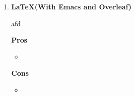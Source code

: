 \documentclass[a4paper,12pt]{article}
\begin{document}
\begin{enumerate}
\item \textbf{\LaTeX (With Emacs and Overleaf)}\\
  \begin{center}
    \href{af}{afd}\\
  \end{center}

  \textbf{Pros}
  \begin{itemize}
  \item 
  \end{itemize}
  
  \textbf{Cons}
  \begin{itemize}
  \item 
  \end{itemize}
\end{enumerate}
\end{document}
